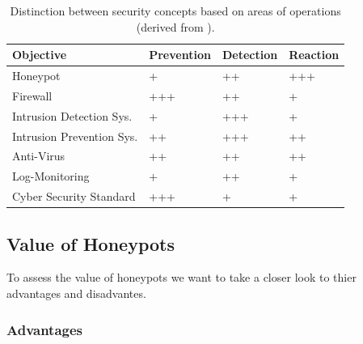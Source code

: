 \begin{table}[h]
    \centering
    \caption[Distinction between security concepts (derived from \cite{NawrockiWSKS2016})]{Distinction between security concepts based on areas of operations (derived from \cite{NawrockiWSKS2016}).}
    \begin{tabular}{l|lll}
        \toprule
        \textbf{Objective}        & \textbf{Prevention} & \textbf{Detection} & \textbf{Reaction} \\ \hline
        Honeypot                  & +                   & ++                 & +++               \\
        Firewall                  & +++                 & ++                 & +                 \\
        Intrusion Detection Sys.  & +                   & +++                & +                 \\
        Intrusion Prevention Sys. & ++                  & +++                & ++                \\
        Anti-Virus                & ++                  & ++                 & ++                \\
        Log-Monitoring            & +                   & ++                 & +                 \\
        Cyber Security Standard   & +++                 & +                  & +                 \\
        \bottomrule
    \end{tabular}
    \label{tab:honeypots-security-concepts}
\end{table}

\subsection{Value of Honeypots}

To assess the value of honeypots we want to take a closer look to thier advantages and disadvantes.\cite{Mokube2007,Kaur2014, Spitzner2003}

\subsubsection{Advantages}

